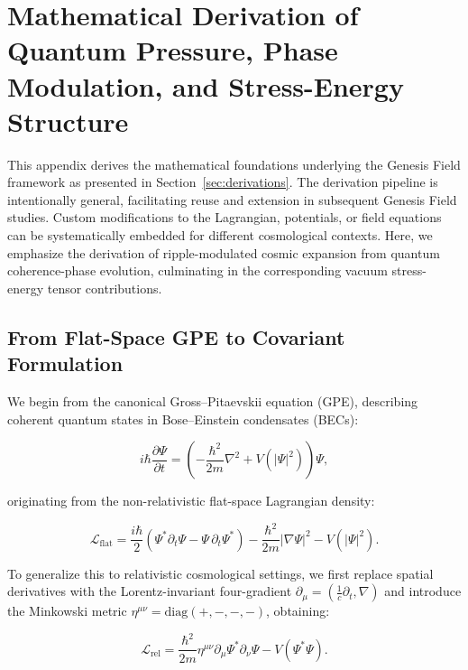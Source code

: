 \section{Mathematical Derivation of Quantum Pressure, Phase Modulation, and Stress-Energy Structure}
\label{sec:appendix_math_derivation}

This appendix derives the mathematical foundations underlying the Genesis Field framework as presented in Section~\ref{sec:derivations}. The derivation pipeline is intentionally general, facilitating reuse and extension in subsequent Genesis Field studies. Custom modifications to the Lagrangian, potentials, or field equations can be systematically embedded for different cosmological contexts. Here, we emphasize the derivation of ripple-modulated cosmic expansion from quantum coherence-phase evolution, culminating in the corresponding vacuum stress-energy tensor contributions.

\subsection{From Flat-Space GPE to Covariant Formulation}

We begin from the canonical Gross–Pitaevskii equation (GPE), describing coherent quantum states in Bose–Einstein condensates (BECs):

\begin{equation}
i\hbar\frac{\partial \Psi}{\partial t} = \left(-\frac{\hbar^2}{2m}\nabla^2 + V(|\Psi|^2)\right)\Psi,
\label{eq:gpe_original}
\end{equation}

originating from the non-relativistic flat-space Lagrangian density:

\begin{equation}
\mathcal{L}_{\text{flat}} = \frac{i\hbar}{2}\left(\Psi^*\partial_t\Psi - \Psi\,\partial_t\Psi^*\right) - \frac{\hbar^2}{2m}\left|\nabla\Psi\right|^2 - V(|\Psi|^2).
\label{eq:flat_space_lagrangian}
\end{equation}

To generalize this to relativistic cosmological settings, we first replace spatial derivatives with the Lorentz-invariant four-gradient $\partial_\mu = (\frac{1}{c}\partial_t,\nabla)$ and introduce the Minkowski metric $\eta^{\mu\nu}=\text{diag}(+,-,-,-)$, obtaining:

\begin{equation}
\mathcal{L}_{\text{rel}} = \frac{\hbar^2}{2m}\eta^{\mu\nu}\partial_\mu\Psi^*\partial_\nu\Psi - V(\Psi^*\Psi).
\label{eq:relativistic_lagrangian}
\end{equation}

